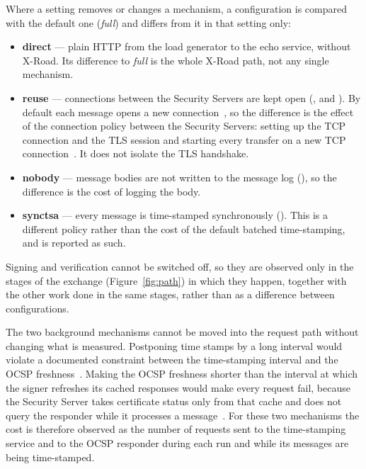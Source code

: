 \documentclass[conference,a4paper]{IEEEtran}
\newcommand{\newtext}[1]{{\color{blue}#1}}
\begin{document}
Where a setting removes or changes a mechanism, a configuration is compared with the default one
(\emph{full}) and differs from it in that setting only:

\begin{itemize}
  \item \textbf{direct} --- plain HTTP from the load generator to the echo service, without X-Road.
  Its difference to \emph{full} is the whole X-Road path, not any single mechanism.
  \item {\sloppy \textbf{reuse} --- connections between the Security Servers are kept open
  (,  and
  ). By default each message opens a new
  connection~\cite{xroadsyspar}, so the difference is the effect of the connection policy between
  the Security Servers: setting up the TCP connection and the TLS session and starting every
  transfer on a new TCP connection~\cite{naylor2014}. It does not isolate the TLS handshake.\par}
  \item \textbf{nobody} --- message bodies are not written to the message log
  (), so the difference is the cost of logging the body.
  \item \textbf{synctsa} --- every message is time-stamped synchronously
  (). This is a different policy rather than the cost of the
  default batched time-stamping, and is reported as such.
\end{itemize}

Signing and verification cannot be switched off, so they are observed only in the stages of the
\newtext{exchange (Figure~\ref{fig:path})} in which they happen, together with the other work done in the same stages, rather than as
a difference between configurations.

The two background mechanisms cannot be moved into the request path without changing what is
measured. Postponing time stamps by a long interval would violate a documented constraint between the
time-stamping interval and the OCSP freshness~\cite{xroadsyspar}. Making the OCSP freshness shorter
than the interval at which the signer refreshes its cached responses \newtext{would} make every request fail,
because the Security Server takes certificate status only from that cache and does not query the
responder while it processes a message\newtext{~\cite{xroadsrc}}. For these two mechanisms the cost is therefore observed as the number of requests
sent to the time-stamping service and to the OCSP responder during each run and while its messages
are being time-stamped.
\end{document}
